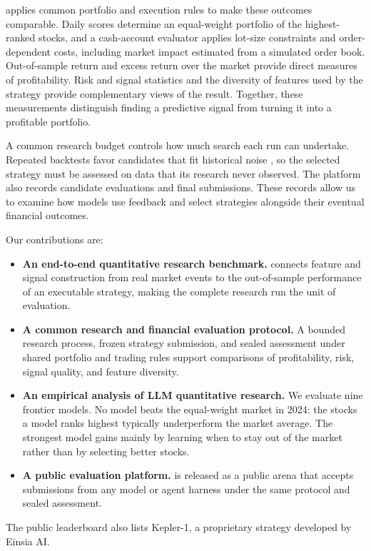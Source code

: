 \BenchmarkName{} applies common portfolio and execution rules to make these outcomes comparable. Daily scores determine an equal-weight portfolio of the highest-ranked stocks, and a cash-account evaluator applies lot-size constraints and order-dependent costs, including market impact estimated from a simulated order book. Out-of-sample return and excess return over the market provide direct measures of profitability. Risk and signal statistics and the diversity of features used by the strategy provide complementary views of the result. Together, these measurements distinguish finding a predictive signal from turning it into a profitable portfolio.

A common research budget controls how much search each run can undertake. Repeated backtests favor candidates that fit historical noise \citep{Bailey2017Backtest}, so the selected strategy must be assessed on data that its research never observed. The platform also records candidate evaluations and final submissions. These records allow us to examine how models use feedback and select strategies alongside their eventual financial outcomes.

Our contributions are:

\begin{itemize}[leftmargin=*,itemsep=2pt]
    \item \textbf{An end-to-end quantitative research benchmark.} \BenchmarkName{} connects feature and signal construction from real market events to the out-of-sample performance of an executable strategy, making the complete research run the unit of evaluation.
    \item \textbf{A common research and financial evaluation protocol.} A bounded research process, frozen strategy submission, and sealed assessment under shared portfolio and trading rules support comparisons of profitability, risk, signal quality, and feature diversity.
    \item \textbf{An empirical analysis of LLM quantitative research.} We evaluate nine frontier models. No model beats the equal-weight market in 2024: the stocks a model ranks highest typically underperform the market average. The strongest model gains mainly by learning when to stay out of the market rather than by selecting better stocks.
    \item \textbf{A public evaluation platform.} \BenchmarkName{} is released as a public arena that accepts submissions from any model or agent harness under the same protocol and sealed assessment.
\end{itemize}

The public leaderboard also lists Kepler-1, a proprietary strategy developed by Einsia AI.
